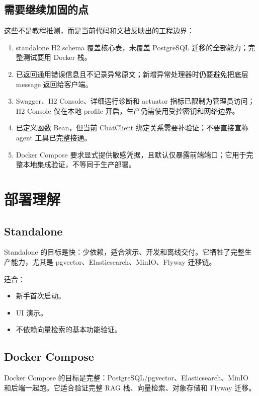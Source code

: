 \documentclass[UTF8,zihao=-4]{ctexart}
\begin{document}
\subsection{需要继续加固的点}

这些不是教程推测，而是当前代码和文档反映出的工程边界：

\begin{enumerate}
  \item standalone H2 schema 覆盖核心表，未覆盖 PostgreSQL 迁移的全部能力；完整测试要用 Docker 栈。
  \item {} 已返回通用错误信息且不记录异常原文；新增异常处理器时仍要避免把底层 message 返回给客户端。
  \item Swagger、H2 Console、详细运行诊断和 actuator 指标已限制为管理员访问；H2 Console 仅在本地 profile 开启，生产仍需使用受控密钥和网络边界。
  \item {} 已定义函数 Bean，但当前 ChatClient 绑定关系需要补验证；不要直接宣称 agent 工具已完整接通。
  \item Docker Compose 要求显式提供敏感凭据，且默认仅暴露前端端口；它用于完整本地集成验证，不等同于生产部署。
\end{enumerate}

\section{部署理解}

\subsection{Standalone}

Standalone 的目标是快：少依赖，适合演示、开发和离线交付。它牺牲了完整生产能力，尤其是 pgvector、Elasticsearch、MinIO、Flyway 迁移链。

适合：

\begin{itemize}
  \item 新手首次启动。
  \item UI 演示。
  \item 不依赖向量检索的基本功能验证。
\end{itemize}

\subsection{Docker Compose}

Docker Compose 的目标是完整：PostgreSQL/pgvector、Elasticsearch、MinIO 和后端一起跑。它适合验证完整 RAG 栈、向量检索、对象存储和 Flyway 迁移。
\end{document}
